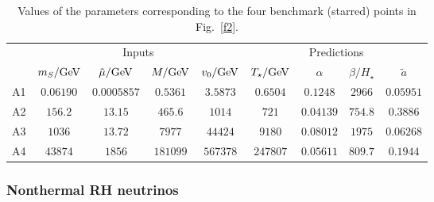 \documentclass[a4paper,11pt]{article}
\begin{document}
\begin{table}[t]
\begin{center}
\begin{tabular}{ l | cccc | cccc }
 \hline\hline
& \multicolumn{4}{c|}{Inputs} & \multicolumn{4}{c}{Predictions} \\
 \cline{2-9}
 &  $m_S/{\rm GeV}$ & $\tilde{\mu}/{\rm GeV}$ & $M/{\rm GeV}$ & $v_0/{\rm GeV}$ & $T_\star/{\rm GeV}$ & $\alpha$ & $\beta / H_\star$ & $\widetilde{a}$  \\\hline\hline
 A1 & $0.06190$ & $0.0005857$ & $0.5361$ & $3.5873$ & $0.6504$ & $0.1248$ & $2966$ & $0.05951$ \\
 \hline
A2 & $156.2$ & $13.15$ & $465.6$ & $1014$ & $721$ & $0.04139$ & $754.8$ & $0.3886$ \\
A3 & $1036$ & $13.72$ & $7977$ & $44424$ & $9180$ & $0.08012$ & $1975$ & $0.06268$ \\
A4 & $43874$ & $1856$ & $181099$ & $567378$ & $247807$ & $0.05611$ & $809.7$ & $0.1944$ \\
 \hline\hline
\end{tabular}
\end{center}
\caption{Values of the parameters corresponding to the four benchmark (starred) points in Fig.~\ref{f2}.}
\label{tab:samples_highT1}
\end{table}


\subsubsection{Nonthermal RH neutrinos}
\end{document}
